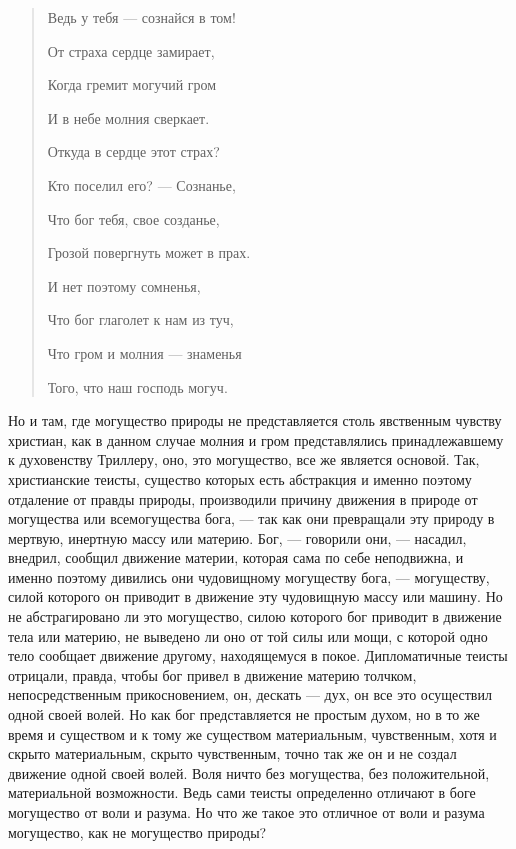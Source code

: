 \documentclass[12pt]{article}
\begin{document}
\begin{quote}
    
Ведь у тебя --- сознайся в том! 

От страха сердце замирает, 

Когда гремит могучий гром 

И в небе молния сверкает. 

Откуда в сердце этот страх? 

Кто поселил его? --- Сознанье, 

Что бог тебя, свое созданье, 

Грозой повергнуть может в прах. 

И нет поэтому сомненья,

Что бог глаголет к нам из туч,

Что гром и молния --- знаменья 

Того, что наш господь могуч. 

\end{quote}


Но и там, где могущество природы не представляется столь явственным чувству христиан, как в данном случае молния и гром представлялись принадлежавшему к духовенству Триллеру, оно, это могущество, все же является основой. Так, христианские теисты, существо которых есть абстракция и именно поэтому отдаление от правды природы, производили причину движения в природе от могущества или всемогущества бога, --- так как они превращали эту природу в мертвую, инертную массу или материю. Бог, --- говорили они, --- насадил, внедрил, сообщил движение материи, которая сама по себе неподвижна, и именно поэтому дивились они чудовищному могуществу бога, --- могуществу, силой которого он приводит в движение эту чудовищную массу или машину. Но не абстрагировано ли это могущество, силою которого бог приводит в движение тела или материю, не выведено ли оно от той силы или мощи, с которой одно тело сообщает движение другому, находящемуся в покое. Дипломатичные теисты отрицали, правда, чтобы бог привел в движение материю толчком, непосредственным прикосновением, он, дескать --- дух, он все это осуществил одной своей волей. Но как бог представляется не простым духом, но в то же время и существом и к тому же существом материальным, чувственным, хотя и скрыто материальным, скрыто чувственным, точно так же он и не создал движение одной своей волей. Воля ничто без могущества, без положительной, материальной возможности. Ведь сами теисты определенно отличают в боге могущество от воли и разума. Но что же такое это отличное от воли и разума могущество, как не могущество природы? 
\end{document}
